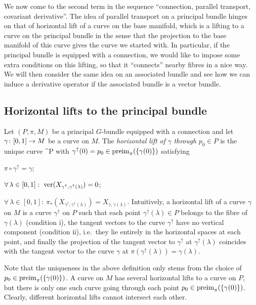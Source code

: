We now come to the second term in the sequence ``connection, parallel transport, covariant derivative''. The idea of parallel transport on a principal bundle hinges on that of horizontal lift of a curve on the base manifold, which is a lifting to a curve on the principal bundle in the sense that the projection to the base manifold of this curve gives the curve we started with. In particular, if the principal bundle is equipped with a connection, we would like to impose some extra conditions on this lifting, so that it ``connects'' nearby fibres in a nice way. We will then consider the same idea on an associated bundle and see how we can induce a derivative operator if the associated bundle is a vector bundle. 


\subsection{Horizontal lifts to the principal bundle}

\bd
Let $(P,\pi,M)$ be a principal $G$-bundle equipped with a connection and let $\gamma\colon[0,1]\to M$ be a curve on $M$. The \emph{horizontal lift of $\gamma$ through $p_0\in P$} is the unique curve
\bse
\gamma^{\uparrow}\cl [0,1] \to P
\ese
with $\gamma^\uparrow(0)=p_0\in \operatorname{preim}_\pi(\{\gamma(0)\})$ satisfying
\ben[label=\roman*)]
\item $\pi \circ \gamma^{\uparrow} = \gamma$;
\item $\forall \, \lambda\in [0,1] : \ \ver(X_{\gamma^{\uparrow},\gamma^{\uparrow}(\lambda)})=0$;
\item $\forall \, \lambda\in [0,1] : \ \pi_*(X_{\gamma^{\uparrow},\gamma^{\uparrow}(\lambda)})=X_{\gamma,\gamma(\lambda)}$.
\een
\ed
Intuitively, a horizontal lift of a curve $\gamma$ on $M$ is a curve $\gamma^\uparrow$ on $P$ such that each point $\gamma^\uparrow(\lambda)\in P$ belongs to the fibre of $\gamma(\lambda)$ (condition i), the tangent vectors to the curve $\gamma^\uparrow$ have no vertical component (condition ii), i.e.\ they lie entirely in the horizontal spaces at each point, and finally the projection of the tangent vector to $\gamma^\uparrow$ at $\gamma^\uparrow(\lambda)$ coincides with the tangent vector to the curve $\gamma$ at $\pi(\gamma^\uparrow(\lambda))=\gamma(\lambda)$.

\br
Note that the uniqueness in the above definition only stems from the choice of $p_0\in\operatorname{preim}_\pi(\{\gamma(0)\})$. A curve on $M$ has several horizontal lifts to a curve on $P$, but there is only one such curve going through each point $p_0\in\operatorname{preim}_\pi(\{\gamma(0)\})$. Clearly, different horizontal lifts cannot intersect each other.
\er

